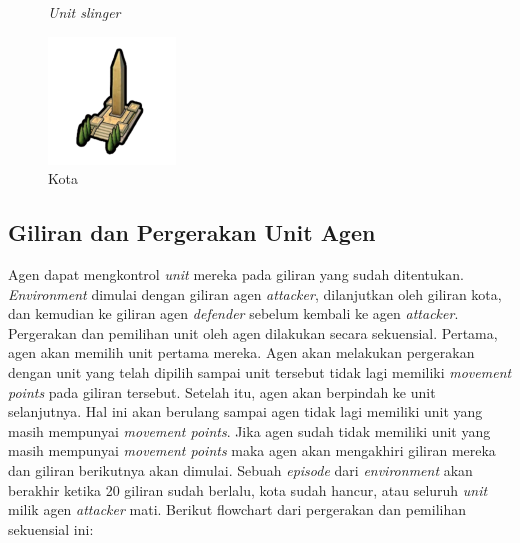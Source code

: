 \begin{figure}[!htb]
\begin{minipage}{0.32\textwidth}
    \caption{\emph{Unit slinger}}\label{Fig:slinger}
  \end{minipage}
  \begin{minipage}{0.32\textwidth}
    \centering
    \includegraphics[width=\linewidth]{gambar/city.png}
    \caption{Kota}\label{Fig:kota}
  \end{minipage}
\end{figure}

\subsection{Giliran dan Pergerakan Unit Agen}
Agen dapat mengkontrol \emph{unit} mereka pada giliran yang sudah ditentukan. 
\emph{Environment} dimulai dengan giliran agen \emph{attacker}, dilanjutkan oleh giliran kota, dan kemudian
ke giliran agen \emph{defender} sebelum kembali ke agen \emph{attacker}. 
Pergerakan dan pemilihan unit oleh agen dilakukan secara sekuensial. Pertama, agen akan memilih unit pertama mereka.
Agen akan melakukan pergerakan dengan unit yang telah dipilih sampai unit tersebut tidak lagi memiliki \emph{movement points}
pada giliran tersebut.
Setelah itu, agen akan berpindah ke unit selanjutnya. Hal ini akan berulang sampai agen tidak lagi memiliki unit yang masih
mempunyai \emph{movement points}. Jika agen sudah tidak memiliki unit yang masih mempunyai \emph{movement points}
maka agen akan mengakhiri giliran mereka dan giliran berikutnya akan dimulai. 
Sebuah \emph{episode} dari \emph{environment} akan berakhir ketika 20 giliran sudah berlalu, kota sudah hancur, atau seluruh \emph{unit}
milik agen \emph{attacker} mati.
Berikut flowchart dari pergerakan dan pemilihan sekuensial ini:

